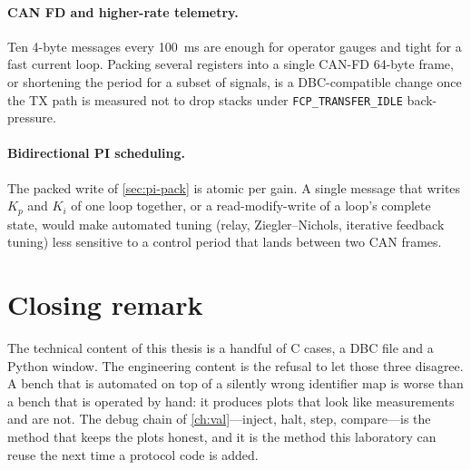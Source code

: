\paragraph{CAN FD and higher-rate telemetry.}
Ten 4-byte messages every \SI{100}{\milli\second} are enough for
operator gauges and tight for a fast current loop. Packing several
registers into a single CAN-FD 64-byte frame, or shortening the period
for a subset of signals, is a DBC-compatible change once the TX path
is measured not to drop stacks under \texttt{FCP\_TRANSFER\_IDLE}
back-pressure.

\paragraph{Bidirectional PI scheduling.}
The packed write of \cref{sec:pi-pack} is atomic per gain. A single
message that writes $K_p$ and $K_i$ of one loop together, or a
read-modify-write of a loop's complete state, would make automated
tuning (relay, Ziegler--Nichols, iterative feedback tuning) less
sensitive to a control period that lands between two CAN frames.

\section{Closing remark}
The technical content of this thesis is a handful of C cases, a DBC
file and a Python window. The engineering content is the refusal to let
those three disagree. A bench that is automated on top of a silently
wrong identifier map is worse than a bench that is operated by hand:
it produces plots that look like measurements and are not. The
debug chain of \cref{ch:val}---inject, halt, step, compare---is the
method that keeps the plots honest, and it is the method this
laboratory can reuse the next time a protocol code is added.
